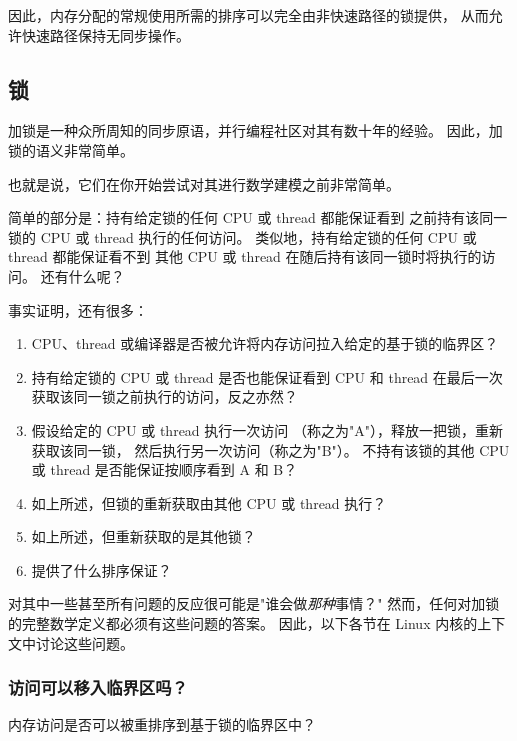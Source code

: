 因此，内存分配的常规使用所需的排序可以完全由非快速路径的锁提供，
从而允许快速路径保持无同步操作。

\subsection{锁}
\label{sec:memorder:Locking}

加锁是一种众所周知的同步原语，并行编程社区对其有数十年的经验。
因此，加锁的语义非常简单。

也就是说，它们在你开始尝试对其进行数学建模之前非常简单。

简单的部分是：持有给定锁的任何 CPU 或 thread 都能保证看到
之前持有该同一锁的 CPU 或 thread 执行的任何访问。
类似地，持有给定锁的任何 CPU 或 thread 都能保证看不到
其他 CPU 或 thread 在随后持有该同一锁时将执行的访问。
还有什么呢？

事实证明，还有很多：

\begin{enumerate}
\item	CPU、thread 或编译器是否被允许将内存访问拉入给定的基于锁的临界区？
\item	持有给定锁的 CPU 或 thread 是否也能保证看到
	CPU 和 thread 在最后一次获取该同一锁之前执行的访问，反之亦然？
\item	假设给定的 CPU 或 thread 执行一次访问
	（称之为"A"），释放一把锁，重新获取该同一锁，
	然后执行另一次访问（称之为"B"）\@。
	不持有该锁的其他 CPU 或 thread 是否能保证按顺序看到 A 和 B？
\item	如上所述，但锁的重新获取由其他 CPU 或 thread 执行？
\item	如上所述，但重新获取的是其他锁？
\item	{} 提供了什么排序保证？
\end{enumerate}

对其中一些甚至所有问题的反应很可能是"谁会做\emph{那种}事情？"
然而，任何对加锁的完整数学定义都必须有这些问题的答案。
因此，以下各节在 Linux 内核的上下文中讨论这些问题。

\subsubsection{访问可以移入临界区吗？}
\label{sec:memorder:Accesses Into Critical Sections?}

内存访问是否可以被重排序到基于锁的临界区中？

\begin{listing}

\caption{之前的访问移入临界区（有排序吗？）}
\label{lst:memorder:Prior Accesses Into Critical Section (Ordering?)}
\end{listing}


